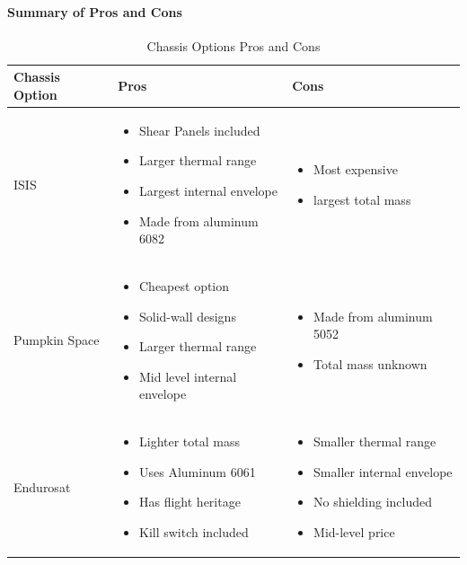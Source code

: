 \paragraph{Summary of Pros and Cons}\hspace{1cm} 
\begin{table}[H]
\centering
\begin{tabular}{|p{}|p{}|p{}|} 
\hline
\textbf{Chassis Option} & \textbf{Pros} & \textbf{Cons}
\\
\hline
     ISIS
     &
    \begin{itemize}
        \item Shear Panels included
        \item Larger thermal range
        \item Largest internal envelope
        \item Made from aluminum 6082
    \end{itemize}
    &
    \begin{itemize}
        \item Most expensive
        \item largest total mass
    \end{itemize}
    \\
\hline
     Pumpkin Space
     &
    \begin{itemize}
        \item Cheapest option
        \item Solid-wall designs
        \item Larger thermal range
        \item Mid level internal envelope
    \end{itemize}
    &
        \begin{itemize}
        \item Made from aluminum 5052
        \item Total mass unknown
    \end{itemize}
    \\
\hline
    Endurosat
    &
    \begin{itemize}
        \item Lighter total mass
        \item Uses Aluminum 6061
        \item Has flight heritage
        \item Kill switch included
    \end{itemize}
    &
    \begin{itemize}
        \item Smaller thermal range
        \item Smaller internal envelope
        \item No shielding included
        \item Mid-level price
    \end{itemize}
    \\
\hline
\end{tabular}
\caption{Chassis Options Pros and Cons}
\label{tbl:Chassis_ProCon}
\end{table}
